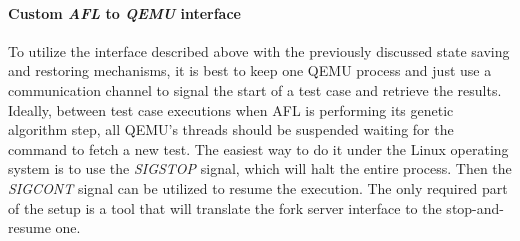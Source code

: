 \paragraph{Custom \textit{AFL} to \textit{QEMU} interface}
To utilize the interface described above with the previously discussed state saving and restoring mechanisms, it is best to keep one QEMU process and just use a communication channel to signal the start of a test case and retrieve the results. Ideally, between test case executions when AFL is performing its genetic algorithm step, all QEMU's threads should be suspended waiting for the command to fetch a new test. The easiest way to do it under the Linux operating system is to use the \textit{SIGSTOP} signal, which will halt the entire process. Then the \textit{SIGCONT} signal can be utilized to resume the execution. The only required part of the setup is a tool that will translate the fork server interface to the stop-and-resume one. 

